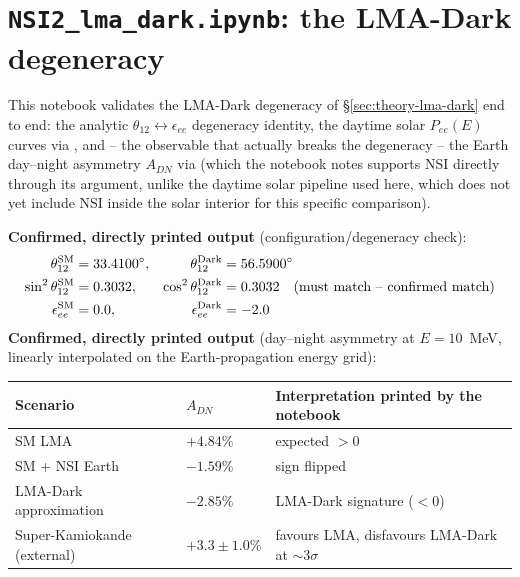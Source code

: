 \section{\texttt{NSI2\_lma\_dark.ipynb}: the LMA-Dark degeneracy}
\label{sec:results-lma-dark}

\begin{implbox}
This notebook validates the LMA-Dark degeneracy of \S\ref{sec:theory-lma-dark}
end to end: the analytic $\theta_{12}\leftrightarrow\epsilon_{ee}$ degeneracy
identity, the daytime solar $P_{ee}(E)$ curves via
, and -- the observable that actually
breaks the degeneracy -- the Earth day--night asymmetry $A_{DN}$ via
 (which the notebook notes
supports NSI directly through its  argument, unlike the
daytime solar pipeline used here, which does not yet include NSI inside the
solar interior for this specific comparison).
\end{implbox}

\begin{resultbox}
\textbf{Confirmed, directly printed output} (configuration/degeneracy check):
\begin{align*}
  \theta_{12}^{\rm SM} &= 33.4100^\circ, &
  \theta_{12}^{\rm Dark} &= 56.5900^\circ \\
  \sin^2\theta_{12}^{\rm SM} &= 0.3032, &
  \cos^2\theta_{12}^{\rm Dark} &= 0.3032 \quad\text{(must match -- confirmed match)} \\
  \epsilon_{ee}^{\rm SM} &= 0.0, &
  \epsilon_{ee}^{\rm Dark} &= -2.0
\end{align*}
\textbf{Confirmed, directly printed output} (day--night asymmetry at
$E=10$~MeV, linearly interpolated on the Earth-propagation energy grid):
\begin{center}
\begin{tabular}{@{}lll@{}}
\toprule
Scenario & $A_{DN}$ & Interpretation printed by the notebook \\
\midrule
SM LMA & $+4.84\%$ & expected $>0$ \\
SM + NSI Earth & $-1.59\%$ & sign flipped \\
LMA-Dark approximation & $-2.85\%$ & LMA-Dark signature ($<0$) \\
\midrule
Super-Kamiokande (external) & $+3.3\pm1.0\%$ & favours LMA, disfavours LMA-Dark at $\sim3\sigma$ \\
\bottomrule
\end{tabular}
\end{center}
\end{resultbox}

